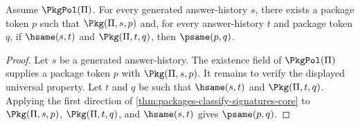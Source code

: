 \begin{theorem}
\label{thm:package-representative-for-generated-answer-history}
Assume $\PkgPol(\Pi)$. For every generated answer-history $s$, there exists a package token $p$ such that $\Pkg(\Pi,s,p)$ and, for every answer-history $t$ and package token $q$, if $\hsame(s,t)$ and $\Pkg(\Pi,t,q)$, then $\psame(p,q)$.
\end{theorem}
\begin{proof}
Let $s$ be a generated answer-history. The existence field of $\PkgPol(\Pi)$ supplies a package token $p$ with $\Pkg(\Pi,s,p)$. It remains to verify the displayed universal property. Let $t$ and $q$ be such that $\hsame(s,t)$ and $\Pkg(\Pi,t,q)$. Applying the first direction of \autoref{thm:packages-classify-signatures-core} to $\Pkg(\Pi,s,p)$, $\Pkg(\Pi,t,q)$, and $\hsame(s,t)$ gives $\psame(p,q)$.
\end{proof}
